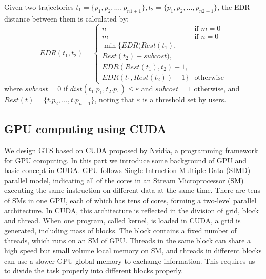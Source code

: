 \documentclass[conference]{IEEEtran}
\begin{document}
	\begin{define}
		Given two trajectories $t_{1}=\{p_{1},p_{2},\ldots,p_{n1+1}\},t_{2}=\{p_{1},p_{2},\ldots,p_{n2+1}\}$, the EDR distance between them is calculated by:
		\begin{equation}
		EDR(t_{1},t_{2}) = 
		\begin{cases}
		n & \text{if $m=0$} \\
		m & \text{if $n=0$} \\
		\min \{EDR(Rest(t_{1}),\\Rest(t_{2})+subcost),\\EDR(Rest(t_{1}),t_{2})+1,\\EDR(t_{1},Rest(t_{2}))+1\} & \text{otherwise}
		\end{cases}
		\end{equation}
		where $subcost = 0$ if $dist(t_{1}.p_{1},t_{2}.p_{1})\leqslant \varepsilon$ and $subcost = 1$ otherwise, and $Rest(t)=\{t.p_{2},\ldots ,t.p_{n+1}\}$, noting that $\varepsilon$ is a threshold set by users.
	\end{define}
	

\subsection{GPU computing using CUDA\cite{nvidia2014toolkit}}
We design GTS based on CUDA proposed by Nvidia, a programming framework for GPU computing. In this part we introduce some background of GPU and basic concept in CUDA. GPU follows Single Intruction Multiple Data (SIMD) parallel model, indicating all of the cores in an Stream Microprocessor (SM) executing the same instruction on different data at the same time. There are tens of SMs in one GPU, each of which has tens of cores, forming a two-level parallel architecture. In CUDA, this architecture is reflected in the division of grid, block and thread. When one program, called kernel, is loaded in CUDA, a grid is generated, including mass of blocks. The block contains a fixed number of threads, which runs on an SM of GPU. Threads in the same block can share a high speed but small volume local memory on SM, and threads in different blocks can use a slower GPU global memory to exchange information. This requires us to divide the task properly into different blocks properly. 
\end{document}
